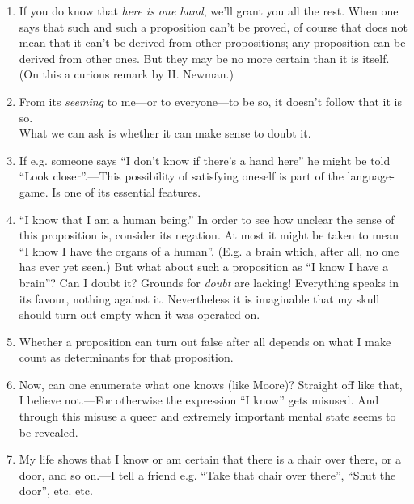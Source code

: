 \documentclass{book}
\begin{document}
\mainmatter

\begin{enumerate}

\item
If you do know that \emph{here is one hand}, we'll grant you all the rest.
When one says that such and such a proposition can't be proved, of course that
does not mean that it can't be derived from other propositions; any proposition
can be derived from other ones. But they may be no more certain than it is
itself. (On this a curious remark by H. Newman.)

\item
From its \emph{seeming} to me---or to everyone---to be so, it doesn't follow
that it is so. \\
What we can ask is whether it can make sense to doubt it.

\item
If e.g. someone says ``I don't know if there's a hand here'' he might be told
``Look closer''.---This possibility of satisfying oneself is part of the
language-game. Is one of its essential features.

\item
``I know that I am a human being.'' In order to see how unclear the sense of
this proposition is, consider its negation. At most it might be taken to mean
``I know I have the organs of a human''. (E.g. a brain which, after all, no one
has ever yet seen.) But what about such a proposition as ``I know I have a
brain''? Can I doubt it? Grounds for \emph{doubt} are lacking! Everything
speaks in its favour, nothing against it. Nevertheless it is imaginable that my
skull should turn out empty when it was operated on.

\item
Whether a proposition can turn out false after all depends on what I make count
as determinants for that proposition.

\item
Now, can one enumerate what one knows (like Moore)? Straight off like that, I
believe not.---For otherwise the expression ``I know'' gets misused. And
through this misuse a queer and extremely important mental state seems to be
revealed.

\item
My life shows that I know or am certain that there is a chair over there, or a
door, and so on.---I tell a friend e.g. ``Take that chair over there'', ``Shut
the door'', etc. etc.


\end{enumerate}
\end{document}
